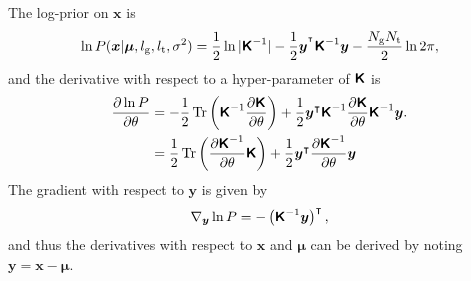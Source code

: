 \documentclass[fleqn,usenatbib]{mnras}
\begin{document}
The log-prior on $\bm{x}$ is
\begin{equation}
    \ln{P(\bm{x}|\boldsymbol{\mu},l_\text{g},l_\text{t},\sigma^2)} = \frac{1}{2}\ln|\textbf{\textsf{K}}^{-1}|-\frac{1}{2}\bm{y}^{^\intercal}\textbf{\textsf{K}}^{-1}\bm{y} -\frac{N_\text{g}N_\text{t}}{2}\ln2\pi,
\end{equation}
and the derivative with respect to a hyper-parameter of $\textbf{\textsf{K}}$ is
\begin{align}
    \frac{\partial\ln P}{\partial \theta} &= -\frac{1}{2}\operatorname{Tr}\left(\textbf{\textsf{K}}^{-1}\frac{\partial\textbf{\textsf{K}}}{\partial \theta}\right) + \frac{1}{2}\bm{y}^\intercal\textbf{\textsf{K}}^{-1}\frac{\partial\textbf{\textsf{K}}}{\partial \theta}\textbf{\textsf{K}}^{-1}\bm{y}.\label{eq:derlg} \\
    &=  \frac{1}{2}\operatorname{Tr}\left(\frac{\partial\textbf{\textsf{K}}^{-1}}{\partial \theta}\textbf{\textsf{K}}\right) + \frac{1}{2}\bm{y}^\intercal\frac{\partial\textbf{\textsf{K}}^{-1}}{\partial \theta}\bm{y} \label{eq:derlt}
\end{align}
The gradient with respect to $\bm{y}$ is given by 
\begin{equation}
    \nabla_{\bm{y}}\ln P = -\left(\textbf{\textsf{K}}^{-1}\bm{y}\right)^\intercal,
\end{equation}
and thus the derivatives with respect to $\bm{x}$ and $\boldsymbol{\mu}$ can be derived by noting $\bm{y}=\bm{x}-\boldsymbol{\mu}$.
\end{document}
